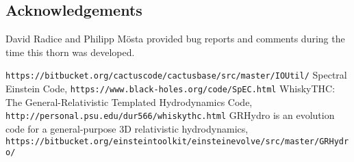 \subsection{Acknowledgements}
David Radice and Philipp M\"osta provided bug reports and comments during the
time this thorn was developed.

\begin{thebibliography}{9}

\verb+https://bitbucket.org/cactuscode/cactusbase/src/master/IOUtil/+
Spectral Einstein Code,
\verb+https://www.black-holes.org/code/SpEC.html+
WhiskyTHC: The General-Relativistic Templated Hydrodynamics Code,
\verb+http://personal.psu.edu/dur566/whiskythc.html+
GRHydro is an evolution code for a general-purpose 3D relativistic
hydrodynamics,
\verb+https://bitbucket.org/einsteintoolkit/einsteinevolve/src/master/GRHydro/+

\end{thebibliography}



